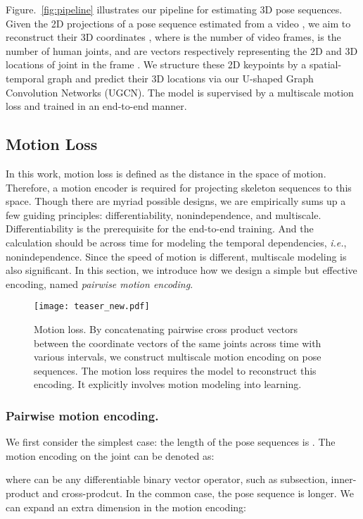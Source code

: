 \documentclass[runningheads]{llncs}
\begin{document}
Figure.~\ref{fig:pipeline} illustrates our pipeline for estimating 3D pose sequences.
Given the 2D projections of a pose sequence estimated from a video ,
we aim to reconstruct their 3D coordinates ,
where  is the number of video frames,  is the number of human joints,
 and  are vectors respectively representing the 2D and 3D locations of joint  in the frame .
We structure these 2D keypoints by a spatial-temporal graph and predict their 3D locations via
our U-shaped Graph Convolution Networks (UGCN).
The model is supervised by a multiscale motion loss and trained in an end-to-end manner.

\subsection{Motion Loss}\label{motion loss}
In this work, motion loss is defined as the distance in the space of motion.
Therefore, a motion encoder is required for projecting skeleton sequences to this space.
Though there are myriad possible designs,
we are empirically sums up a few guiding principles: differentiability, nonindependence, and multiscale.
Differentiability is the prerequisite for the end-to-end training.
And the calculation should be across time for modeling the temporal dependencies, \emph{i.e.}, nonindependence.
Since the speed of motion is different, multiscale modeling is also significant.
In this section, we introduce how we design a simple but effective encoding, named \emph{pairwise motion encoding}.



\begin{figure}[t]
    \centering
    \texttt{[image: teaser\_new.pdf]}
\caption{\small
    Motion loss. By concatenating pairwise cross product vectors between the coordinate vectors of the same joints across time with various intervals, we construct multiscale motion encoding on pose sequences.
    The motion loss requires the model to reconstruct this encoding.
    It explicitly involves motion modeling into learning.
    }
\label{fig:teaser}
\end{figure}

\subsubsection{Pairwise motion encoding.}
We first consider the simplest case: the length of the pose sequences is .
The motion encoding on the joint  can be denoted as:

where  can be any differentiable binary vector operator,
such as subsection, inner-product and cross-prodcut.
In the common case, the pose sequence is longer.
We can expand an extra dimension in the motion encoding:
\end{document}

